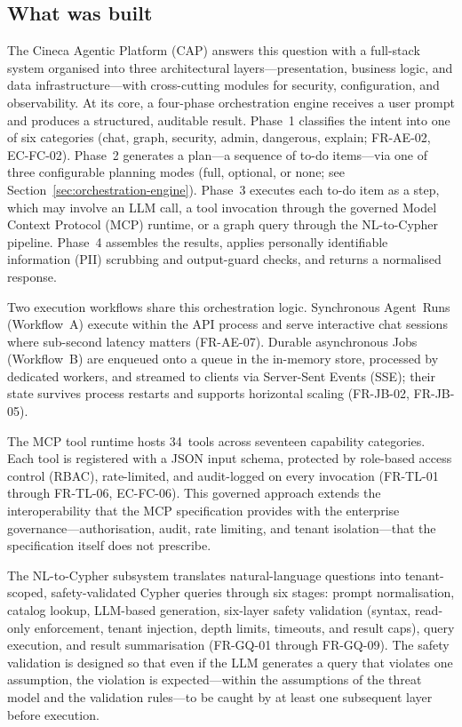 \documentclass[a4paper]{sapthesis}
\begin{document}
\subsection{What was built}

The Cineca Agentic Platform (CAP) answers this question with a full-stack
system organised into three architectural layers---presentation, business
logic, and data infrastructure---with cross-cutting modules for security,
configuration, and observability.  At its core, a four-phase orchestration
engine receives a user prompt and produces a structured, auditable result.
Phase~1 classifies the intent into one of six categories (chat, graph,
security, admin, dangerous, explain; FR-AE-02, EC-FC-02).  Phase~2
generates a plan---a sequence of to-do items---via one of three
configurable planning modes (full, optional, or none; see
Section~\ref{sec:orchestration-engine}).  Phase~3
executes each to-do item as a step, which may involve an LLM call, a tool
invocation through the governed Model Context Protocol (MCP) runtime, or a
graph query through the NL-to-Cypher pipeline.  Phase~4 assembles the
results, applies personally identifiable information (PII) scrubbing and
output-guard checks, and returns a normalised response.

Two execution workflows share this orchestration logic.  Synchronous
Agent~Runs (Workflow~A) execute within the API process and serve
interactive chat sessions where sub-second latency matters (FR-AE-07).
Durable asynchronous Jobs (Workflow~B) are enqueued onto a queue in the
in-memory store, processed by dedicated workers, and streamed to clients via Server-Sent
Events (SSE); their state survives process restarts and supports horizontal
scaling (FR-JB-02, FR-JB-05).

The MCP tool runtime hosts 34~tools across seventeen capability categories.
Each tool is registered with a JSON input schema, protected by role-based
access control (RBAC), rate-limited, and audit-logged on every invocation
(FR-TL-01 through FR-TL-06, EC-FC-06).  This governed approach extends the
interoperability that the MCP specification provides with the enterprise
governance---authorisation, audit, rate limiting, and tenant
isolation---that the specification itself does not prescribe.

The NL-to-Cypher subsystem translates natural-language questions into
tenant-scoped, safety-validated Cypher queries through six stages: prompt
normalisation, catalog lookup, LLM-based generation, six-layer safety
validation (syntax, read-only enforcement, tenant injection, depth limits,
timeouts, and result caps), query execution, and result summarisation
(FR-GQ-01 through FR-GQ-09).  The safety validation is designed so that
even if the LLM generates a query that violates one assumption, the
violation is expected---within the assumptions of the threat model and
the validation rules---to be caught by at least one subsequent layer
before execution.
\end{document}
